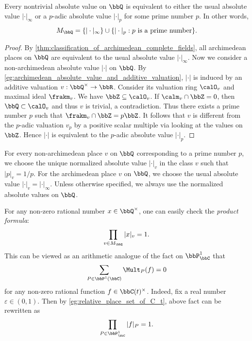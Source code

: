     \begin{theorem}[Ostrowski]\label{thm:ostrowski_theorem_places_on_Q}
        Every nontrivial absolute value on \(\bbQ\) is equivalent to either the usual absolute value \(|\cdot|_\infty\) or a \(p\)-adic absolute value \(|\cdot|_p\) for some prime number \(p\).
        In other words, 
        \[ M_\bbQ = \{|\cdot|_\infty\} \cup \{| \cdot |_p : p \text{ is a prime number}\}. \]
    \end{theorem}
    \begin{proof}
        By \cref{thm:classification_of_archimedean_complete_fields}, all archimedean places on \(\bbQ\) are equivalent to the usual absolute value \(|\cdot|_\infty\).
        Now we consider a non-archimedean absolute value \(|\cdot|\) on \(\bbQ\).
        By \cref{eg:archimedean_absolute_value_and_additive_valuation}, \(|\cdot|\) is induced by an additive valuation \(v: \bbQ^\times \to \bbR\).
        Consider its valuation ring \(\calO_v\) and maximal ideal \(\frakm_v\).
        We have \(\bbZ \subseteq \calO_v\).
        If \(\calm_v \cap \bbZ = 0\), then \(\bbQ \subset \calO_v\) and thus \(v\) is trivial, a contradiction.
        Thus there exists a prime number \(p\) such that \(\frakm_v \cap \bbZ = p \bbZ\).
        It follows that \(v\) is different from the \(p\)-adic valuation \(v_p\) by a positive scalar multiple via looking at the values on \(\bbZ\).
        Hence \(|\cdot|\) is equivalent to the \(p\)-adic absolute value \(|\cdot|_p\).
    \end{proof}

    \begin{remark}\label{rmk:normalized_place_on_Q}
        For every non-archimedean place \(v\) on \(\bbQ\) corresponding to a prime number \(p\), 
        we choose the unique normalized absolute value \(|\cdot|_v\) in the class \(v\) such that \(|p|_v = 1/p\).
        For the archimedean place \(v\) on \(\bbQ\), we choose the usual absolute value \(|\cdot|_v = |\cdot|_\infty\).
        Unless otherwise specified, we always use the normalized absolute values on \(\bbQ\).
    \end{remark}

    \begin{remark}\label{rmk:product_formula_on_Q}
        For any non-zero rational number \(x \in \bbQ^\times\), one can easily check the \emph{product formula}:
        \[ \prod_{v \in M_\bbQ} |x|_v = 1. \]
        This can be viewed as an arithmetic analogue of the fact on \(\bbP_\bbC^1\) that 
        \[ \sum_{P \in \bbP^1(\bbC)} \Mult_P(f) = 0 \]
        for any non-zero rational function \(f \in \bbC(t)^\times\).
        Indeed, fix a real number \(\varepsilon \in (0,1)\).
        Then by \cref{eg:relative_place_set_of_C_t}, above fact can be rewritten as
        \[ \prod_{P \in \bbP_\bbC^1} |f|_P = 1. \]
    \end{remark}
    
